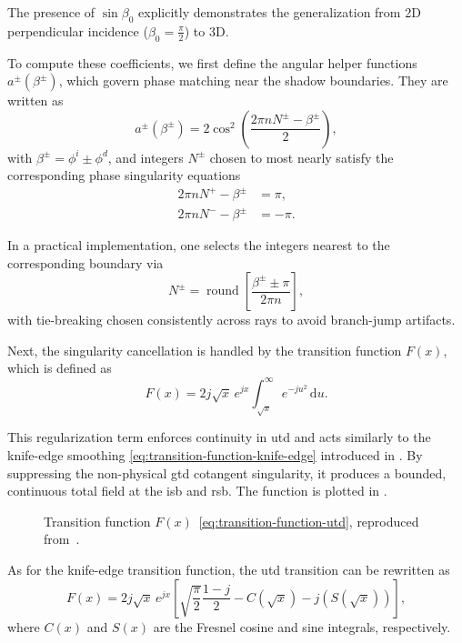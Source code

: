 The presence of $\sin\beta_0$ explicitly demonstrates the generalization from 2D perpendicular incidence ($\beta_0 = \tfrac{\pi}{2}$) to 3D.

To compute these coefficients, we first define the angular helper functions $a^{\pm}(\beta^{\pm})$, which govern phase matching near the shadow boundaries. They are written as
\begin{equation}
  a^{\pm}(\beta^{\pm}) = 2\cos^2\left(\frac{2\pi n N^{\pm} - \beta^{\pm}}{2}\right),
\end{equation}
with $\beta^{\pm} = \phi^i \pm \phi^{d}$, and integers $N^{\pm}$ chosen to most nearly satisfy the corresponding phase singularity equations
\begin{align}
  2\pi n N^{+} - \beta^{\pm} &= \pi, \\
  2\pi n N^{-} - \beta^{\pm} &= -\pi.
\end{align}

In a practical implementation, one selects the integers nearest to the corresponding boundary via
\begin{equation}
  N^{\pm}=\operatorname*{round}\left[\frac{\beta^{\pm}\pm\pi}{2\pi n}\right],
\end{equation}
with tie-breaking chosen consistently across rays to avoid branch-jump artifacts.

Next, the singularity cancellation is handled by the transition function $F(x)$, which is defined as
\begin{equation}\label{eq:transition-function-utd}
  F(x) = 2j\sqrt{x}\,e^{jx}\int_{\sqrt{x}}^{\infty} e^{-ju^2}\,\mathrm{d}u.
\end{equation}

This regularization term enforces continuity in \gls{utd} and acts similarly to the knife-edge smoothing \eqref{eq:transition-function-knife-edge} introduced in . By suppressing the non-physical \gls{gtd} cotangent singularity, it produces a bounded, continuous total field at the \gls{isb} and \gls{rsb}. The function is plotted in .

\begin{figure}
  \centering
  \caption{Transition function $F(x)$~\eqref{eq:transition-function-utd}, reproduced from~\cite[Fig.~4.16]{McNamara1990}.}
\end{figure}

As for the knife-edge transition function, the \gls{utd} transition can be rewritten as
\begin{equation}
  F(x) = 2j\sqrt{x}\,e^{jx}\left[\sqrt{\frac{\pi}{2}}\frac{1-j}{2} - C(\sqrt{x}) - j\left(S(\sqrt{x})\right) \right],
\end{equation}
where $C(x)$ and $S(x)$ are the Fresnel cosine and sine integrals, respectively.

